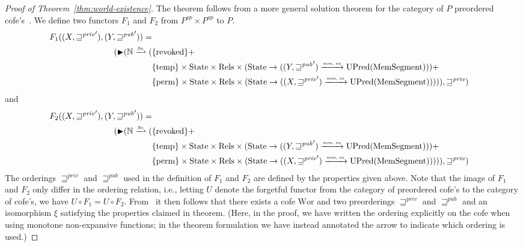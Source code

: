 \documentclass[a4paper]{article}
\newcommand{\finparfun}{\xrightharpoonup{\textit{\tiny{fin}}}}
\newcommand{\monnefun}{\xrightarrow{\textit{\tiny{mon, ne}}}}
\newcommand{\fun}{\rightarrow}
\newcommand{\blater}{\mathop{\blacktriangleright}}
\newcommand{\var}[1]{\mathit{#1}}
\newcommand{\futurewk}{\mathbin{\sqsupseteq}^{\var{pub}}}
\newcommand{\futurestr}{\mathbin{\sqsupseteq}^{\var{priv}}}
\newcommand{\plaindom}[1]{\mathrm{#1}}
\newcommand{\HeapSegments}{\plaindom{MemSegment}}
\newcommand{\nats}{\mathbb{N}}
\newcommand{\Rels}{\plaindom{Rels}}
\newcommand{\States}{\plaindom{State}}
\newcommand{\Wor}{\plaindom{Wor}}
\newcommand{\UPred}[1]{\plaindom{UPred}(#1)}
\newcommand{\plainview}[1]{\mathrm{#1}}
\newcommand{\perma}{\plainview{perm}}
\newcommand{\temp}{\plainview{temp}}
\newcommand{\revoked}{\plainview{revoked}}
\begin{document}
\begin{proof}[Proof of Theorem~\ref{thm:world-existence}]
  The theorem follows from a more general solution theorem for the
  category of $P$ preordered cofe's~\cite{bizjak-note}. 
  We define two functors $F_1$ and $F_2$ from $P^{op}\times P^{op}$ to
  $P$. 
  \begin{align*}
     F_1((X,{\futurestr}'),(Y,{\futurewk}')) = \\
     (\blater (\nats \finparfun ( & \{\revoked\}  + \\
                                          & \{\temp\} \times \States \times \Rels \times (\States \fun ((Y,{\futurewk}') \monnefun \UPred{\HeapSegments})) + \\
                                          & \{\perma\} \times \States
                                            \times \Rels \times
                                            (\States \fun ((X,{\futurestr}')
                                            \monnefun
                                            \UPred{\HeapSegments})))),
                                        \futurestr)
  \end{align*}
  and
  \begin{align*}
     F_2((X,{\futurestr}'),(Y,{\futurewk}')) = \\
     (\blater (\nats \finparfun ( & \{\revoked\}  + \\
                                          & \{\temp\} \times \States \times \Rels \times (\States \fun ((Y,{\futurewk}') \monnefun \UPred{\HeapSegments})) + \\
                                          & \{\perma\} \times \States
                                            \times \Rels \times
                                            (\States \fun ((X,{\futurestr}')
                                            \monnefun
                                            \UPred{\HeapSegments})))),
                                        \futurestr)
  \end{align*}
  The orderings $\futurestr$ and $\futurewk$ used in the definition of
  $F_1$ and $F_2$ are defined by the properties given above.
  Note that the image of $F_1$ and $F_2$ only differ in the ordering
  relation, i.e., letting $U$ denote the forgetful functor from the
  category of preordered cofe's to the category of cofe's, we have
  $U \circ F_1 = U \circ F_2$.
  From~\cite{bizjak-note} it then follows that there exists a cofe $\Wor$ and two
  preorderings $\futurestr$ and $\futurewk$ and an isomorphism $\xi$ satisfying the properties
  claimed in theorem.
  (Here, in the proof, we have written the ordering explicitly on the cofe when
  using monotone non-expansive functions; in the theorem formulation
  we have instead annotated the arrow to indicate which ordering is used.)
\end{proof}
\end{document}
